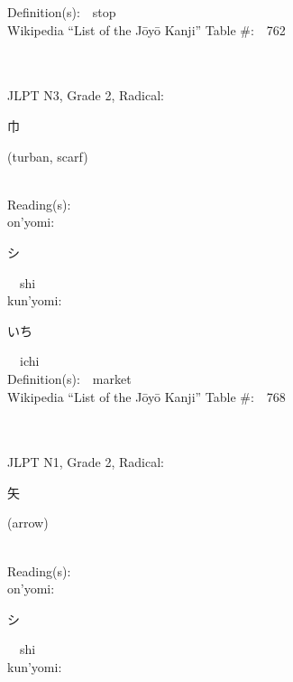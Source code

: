 \begin{multicols}{2}
Definition(s):\ \ stop \\
Wikipedia ``List of the J\=oy\=o Kanji'' Table \#:\ \ 762 \\
\ \ \\
{\fontsize{34pt}{40pt}  }\ \ \\  %
{JLPT N3, Grade 2, Radical:\ \ {\begin{CJK}{UTF8}{min} 巾 \end{CJK}} (turban, scarf) } \\
Reading(s):\ \ \\
{\hspace*{1em}}on'yomi:\ \ \\
{\hspace*{2em}}{\begin{CJK}{UTF8}{min} シ \end{CJK}}\ \ shi\ \ \\
{\hspace*{1em}}kun'yomi:\ \ \\
{\hspace*{2em}}{\begin{CJK}{UTF8}{min} いち \end{CJK}}\ \ ichi\ \ \\
Definition(s):\ \ market \\
Wikipedia ``List of the J\=oy\=o Kanji'' Table \#:\ \ 768 \\
\ \ \\
{\fontsize{34pt}{40pt}  }\ \ \\  %
{JLPT N1, Grade 2, Radical:\ \ {\begin{CJK}{UTF8}{min} 矢 \end{CJK}} (arrow) } \\
Reading(s):\ \ \\
{\hspace*{1em}}on'yomi:\ \ \\
{\hspace*{2em}}{\begin{CJK}{UTF8}{min} シ \end{CJK}}\ \ shi\ \ \\
{\hspace*{1em}}kun'yomi:\ \ \\

\end{multicols}
